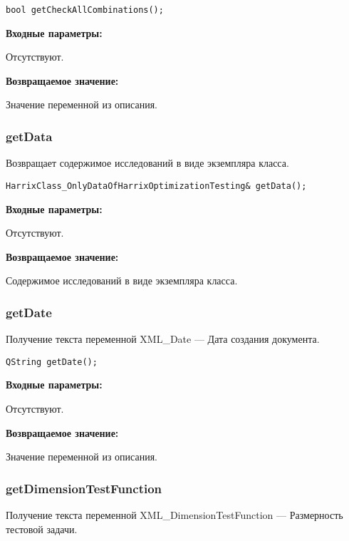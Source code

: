 \documentclass[a4paper,12pt]{article}
\begin{document}
\begin{lstlisting}[label=code_syntax_getCheckAllCombinations,caption=Синтаксис]
bool getCheckAllCombinations();
\end{lstlisting}

\textbf{Входные параметры:}

Отсутствуют.

\textbf{Возвращаемое значение:}

Значение переменной из описания.


\subsubsection{getData}\label{getData}

Возвращает содержимое исследований в виде экземпляра класса.


\begin{lstlisting}[label=code_syntax_getData,caption=Синтаксис]
HarrixClass_OnlyDataOfHarrixOptimizationTesting& getData();
\end{lstlisting}

\textbf{Входные параметры:}

Отсутствуют.

\textbf{Возвращаемое значение:}

Содержимое исследований в виде экземпляра класса.


\subsubsection{getDate}\label{getDate}

Получение текста переменной  XML\_Date --- Дата создания документа.


\begin{lstlisting}[label=code_syntax_getDate,caption=Синтаксис]
QString getDate();
\end{lstlisting}

\textbf{Входные параметры:}

Отсутствуют.

\textbf{Возвращаемое значение:}

Значение переменной из описания.


\subsubsection{getDimensionTestFunction}\label{getDimensionTestFunction}

Получение текста переменной  XML\_DimensionTestFunction --- Размерность тестовой задачи.
\end{document}
